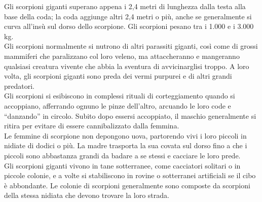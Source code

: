 \begin{multicols}{2}
Gli scorpioni giganti superano appena i 2,4 metri di lunghezza dalla testa alla base della coda; la coda aggiunge altri 2,4 metri o più, anche se generalmente si curva all'insù sul dorso dello scorpione. Gli scorpioni pesano tra i 1.000 e i 3.000 kg.\\

Gli scorpioni normalmente si nutrono di altri parassiti giganti, così come di grossi mammiferi che paralizzano col loro veleno, ma attaccheranno e mangeranno qualsiasi creatura vivente che abbia la sventura di avvicinarglisi troppo. A loro volta, gli scorpioni giganti sono preda dei vermi purpurei e di altri grandi predatori.\\

Gli scorpioni si esibiscono in complessi rituali di corteggiamento quando si accoppiano, afferrando ognuno le pinze dell'altro, arcuando le loro code e “danzando” in circolo. Subito dopo essersi accoppiato, il maschio generalmente si ritira per evitare di essere cannibalizzato dalla femmina.\\

Le femmine di scorpione non depongono uova, partorendo vivi i loro piccoli in nidiate di dodici o più. La madre trasporta la sua covata sul dorso fino a che i piccoli sono abbastanza grandi da badare a se stessi e cacciare le loro prede.\\

Gli scorpioni giganti vivono in tane sotterranee, come cacciatori solitari o in piccole colonie, e a volte si stabiliscono in rovine o sotterranei artificiali se il cibo è abbondante. Le colonie di scorpioni generalmente sono composte da scorpioni della stessa nidiata che devono trovare la loro strada.\\


\end{multicols}
